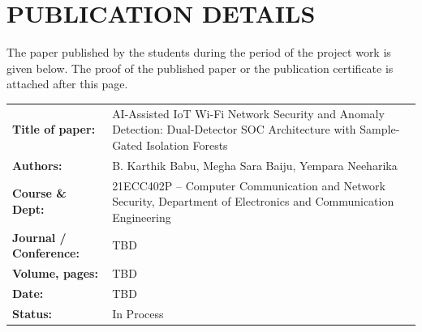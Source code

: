 \documentclass[11pt,a4paper]{report}
\begin{document}
\section*{PUBLICATION DETAILS}
\vspace{-4pt}
The paper published by the students during the period of the project work is given below. The proof of the published paper or the publication certificate is attached after this page.

\vspace{0.2cm}
\noindent
\begin{center}
{\small
\begin{tabular}{|p{4.2cm}|p{11.0cm}|}
\hline
\rowcolor{black!10}
\multicolumn{2}{|l|}{\textbf{PUBLICATION INFORMATION}} \\
\hline
\textbf{Title of paper:} & AI-Assisted IoT Wi-Fi Network Security and Anomaly Detection: Dual-Detector SOC Architecture with Sample-Gated Isolation Forests \\
\hline
\textbf{Authors:} & B. Karthik Babu, Megha Sara Baiju, Yempara Neeharika \\
\hline
\textbf{Course \& Dept:} & 21ECC402P -- Computer Communication and Network Security, Department of Electronics and Communication Engineering \\
\hline
\textbf{Journal / Conference:} & TBD \\
\hline
\textbf{Volume, pages:} & TBD \\
\hline
\textbf{Date:} & TBD \\
\hline
\textbf{Status:} & In Process \\
\hline
\end{tabular}
}
\end{center}
\end{document}
